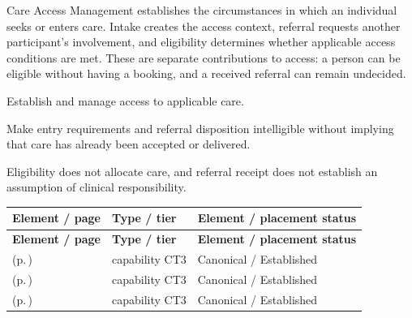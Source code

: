 Care Access Management establishes the circumstances in which an individual seeks or enters care. Intake creates the access context, referral requests another participant's involvement, and eligibility determines whether applicable access conditions are met. These are separate contributions to access: a person can be eligible without having a booking, and a received referral can remain undecided.



Establish and manage access to applicable care.



Make entry requirements and referral disposition intelligible without implying that care has already been accepted or delivered.



Eligibility does not allocate care, and referral receipt does not establish an assumption of clinical responsibility.


\begingroup\small\setlength{\TableWidth}{\dimexpr\linewidth-6\tabcolsep-4\arrayrulewidth\relax}
\begin{longtable}{|>{\raggedright\arraybackslash}p{0.52\TableWidth}|>{\raggedright\arraybackslash}p{0.2\TableWidth}|>{\raggedright\arraybackslash}p{0.28\TableWidth}|}
\hline\rowcolor{TableHead}\textbf{Element / page} & \textbf{Type / tier} & \textbf{Element / placement status}\\\hline\endfirsthead
\hline\rowcolor{TableHead}\textbf{Element / page} & \textbf{Type / tier} & \textbf{Element / placement status}\\\hline\endhead
\hline\endfoot
\nameref{cap:bc-care-intake-management} (p.\,\pageref{cap:bc-care-intake-management}) & capability CT3 & Canonical / Established\\\hline
\nameref{cap:bc-care-referral-management} (p.\,\pageref{cap:bc-care-referral-management}) & capability CT3 & Canonical / Established\\\hline
\nameref{cap:bc-care-eligibility-determination} (p.\,\pageref{cap:bc-care-eligibility-determination}) & capability CT3 & Canonical / Established\\\hline
\end{longtable}\endgroup

